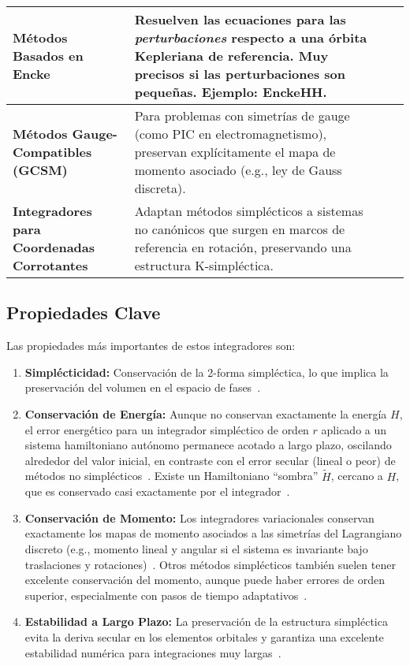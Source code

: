 \begin{table}[htbp]
\begin{adjustbox}{max width=\textwidth}
\begin{tabular}{ >{\bfseries}l | p{} | c }
            \midrule
            Métodos Basados en Encke & Resuelven las ecuaciones para las \textit{perturbaciones} respecto a una órbita Kepleriana de referencia. Muy precisos si las perturbaciones son pequeñas. Ejemplo: EnckeHH.\ &~\cite{hernandez2020} \\
            \midrule
            Métodos Gauge-Compatibles (GCSM) & Para problemas con simetrías de gauge (como PIC en electromagnetismo), preservan explícitamente el mapa de momento asociado (e.g., ley de Gauss discreta). &~\cite{glasser2022} \\
            \midrule
            Integradores para Coordenadas Corrotantes & Adaptan métodos simplécticos a sistemas no canónicos que surgen en marcos de referencia en rotación, preservando una estructura K-simpléctica. &~\cite{tu2019} \\
            \bottomrule
        \end{tabular}
    \end{adjustbox} %
\end{table}

\subsection{Propiedades Clave}
Las propiedades más importantes de estos integradores son:
\begin{enumerate}
    \item \textbf{Simplécticidad:} Conservación de la 2-forma simpléctica, lo que implica la preservación del volumen en el espacio de fases~\cite{stuchi2002, farr2007}.
    \item \textbf{Conservación de Energía:} Aunque no conservan exactamente la energía \(H\), el error energético para un integrador simpléctico de orden \(r\) aplicado a un sistema hamiltoniano autónomo permanece acotado a largo plazo, oscilando alrededor del valor inicial, en contraste con el error secular (lineal o peor) de métodos no simplécticos~\cite{stuchi2002, yoshida1993, hernandez2020}. Existe un Hamiltoniano ``sombra'' \( \tilde{H} \), cercano a \(H\), que es conservado casi exactamente por el integrador~\cite{yoshida1993, hernandez2019b}.
    \item \textbf{Conservación de Momento:} Los integradores variacionales conservan exactamente los mapas de momento asociados a las simetrías del Lagrangiano discreto (e.g., momento lineal y angular si el sistema es invariante bajo traslaciones y rotaciones)~\cite{farr2007, Hernandez2015}. Otros métodos simplécticos también suelen tener excelente conservación del momento, aunque puede haber errores de orden superior, especialmente con pasos de tiempo adaptativos~\cite{Hernandez2015}.
    \item \textbf{Estabilidad a Largo Plazo:} La preservación de la estructura simpléctica evita la deriva secular en los elementos orbitales y garantiza una excelente estabilidad numérica para integraciones muy largas~\cite{wisdom1991, stuchi2002, yoshida1993}.
\end{enumerate}

